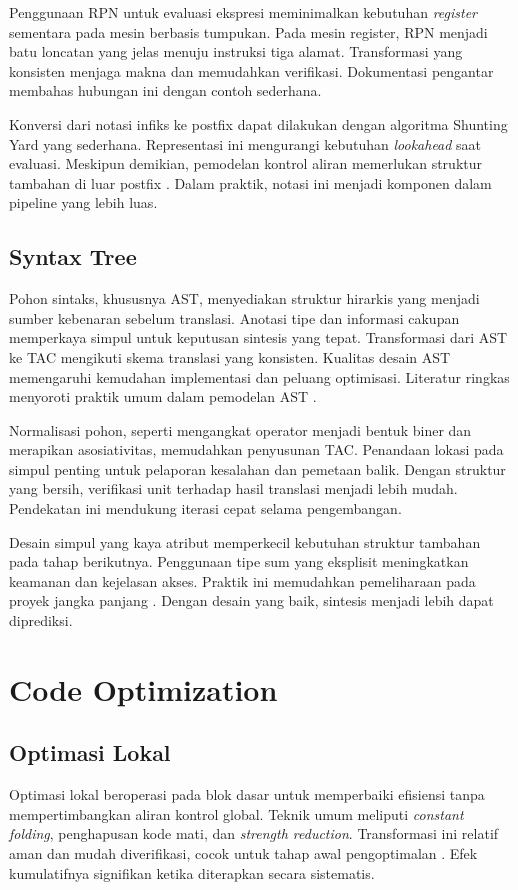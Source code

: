 \documentclass[../main.tex]{subfiles}
\begin{document}
Penggunaan RPN untuk evaluasi ekspresi meminimalkan kebutuhan \emph{register} sementara pada mesin berbasis tumpukan. Pada mesin register, RPN menjadi batu loncatan yang jelas menuju instruksi tiga alamat. Transformasi yang konsisten menjaga makna dan memudahkan verifikasi. Dokumentasi pengantar membahas hubungan ini dengan contoh sederhana.

Konversi dari notasi infiks ke postfix dapat dilakukan dengan algoritma Shunting Yard yang sederhana. Representasi ini mengurangi kebutuhan \emph{lookahead} saat evaluasi. Meskipun demikian, pemodelan kontrol aliran memerlukan struktur tambahan di luar postfix \citep{WikiPostfix}. Dalam praktik, notasi ini menjadi komponen dalam pipeline yang lebih luas.

\subsection{Syntax Tree}
Pohon sintaks, khususnya AST, menyediakan struktur hirarkis yang menjadi sumber kebenaran sebelum translasi. Anotasi tipe dan informasi cakupan memperkaya simpul untuk keputusan sintesis yang tepat. Transformasi dari AST ke TAC mengikuti skema translasi yang konsisten. Kualitas desain AST memengaruhi kemudahan implementasi dan peluang optimisasi. Literatur ringkas menyoroti praktik umum dalam pemodelan AST \citep{WikiAST}.

Normalisasi pohon, seperti mengangkat operator menjadi bentuk biner dan merapikan asosiativitas, memudahkan penyusunan TAC. Penandaan lokasi pada simpul penting untuk pelaporan kesalahan dan pemetaan balik. Dengan struktur yang bersih, verifikasi unit terhadap hasil translasi menjadi lebih mudah. Pendekatan ini mendukung iterasi cepat selama pengembangan.

Desain simpul yang kaya atribut memperkecil kebutuhan struktur tambahan pada tahap berikutnya. Penggunaan tipe sum yang eksplisit meningkatkan keamanan dan kejelasan akses. Praktik ini memudahkan pemeliharaan pada proyek jangka panjang \citep{WikiAST}. Dengan desain yang baik, sintesis menjadi lebih dapat diprediksi.

\section{Code Optimization}
\subsection{Optimasi Lokal}
Optimasi lokal beroperasi pada blok dasar untuk memperbaiki efisiensi tanpa mempertimbangkan aliran kontrol global. Teknik umum meliputi \emph{constant folding}, penghapusan kode mati, dan \emph{strength reduction}. Transformasi ini relatif aman dan mudah diverifikasi, cocok untuk tahap awal pengoptimalan \citep{WikiConstantFolding,WikiDCE,WikiStrengthReduction}. Efek kumulatifnya signifikan ketika diterapkan secara sistematis.
\end{document}
